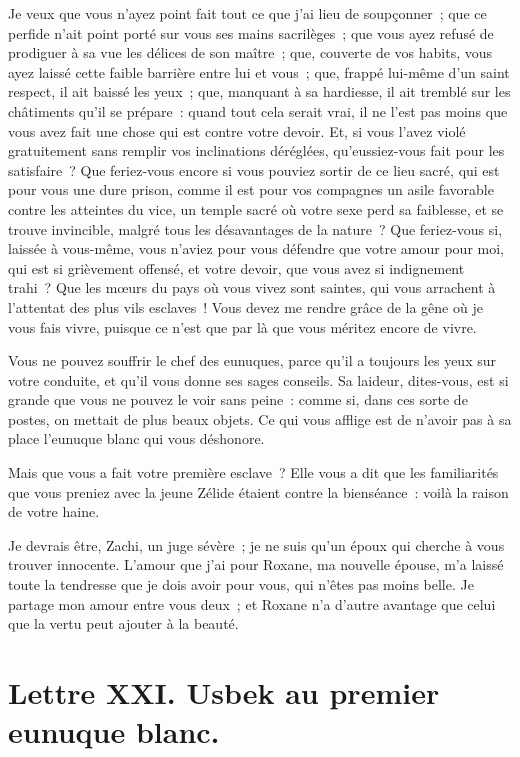 \documentclass[french,twoside]{book} %
\newcommand{\dateline}[1]{\medskip{\RaggedLeft{#1}\par}\bigskip}
\begin{document}
Je veux que vous n’ayez point fait tout ce que j’ai lieu de soupçonner ; que ce perfide n’ait point porté sur vous ses mains sacrilèges ; que vous ayez refusé de prodiguer à sa vue les délices de son maître ; que, couverte de vos habits, vous ayez laissé cette faible barrière entre lui et vous ; que, frappé lui-même d’un saint respect, il ait baissé les yeux ; que, manquant à sa hardiesse, il ait tremblé sur les châtiments qu’il se prépare : quand tout cela serait vrai, il ne l’est pas moins que vous avez fait une chose qui est contre votre devoir. Et, si vous l’avez violé gratuitement sans remplir vos inclinations déréglées, qu’eussiez-vous fait pour les satisfaire ? Que feriez-vous encore si vous pouviez sortir de ce lieu sacré, qui est pour vous une dure prison, comme il est pour vos compagnes un asile favorable contre les atteintes du vice, un temple sacré où votre sexe perd sa faiblesse, et se trouve invincible, malgré tous les désavantages de la nature ? Que feriez-vous si, laissée à vous-même, vous n’aviez pour vous défendre que votre amour pour moi, qui est si grièvement offensé, et votre devoir, que vous avez si indignement trahi ? Que les mœurs du pays où vous vivez sont saintes, qui vous arrachent à l’attentat des plus vils esclaves ! Vous devez me rendre grâce de la gêne où je vous fais vivre, puisque ce n’est que par là que vous méritez encore de vivre.\par
Vous ne pouvez souffrir le chef des eunuques, parce qu’il a toujours les yeux sur votre conduite, et qu’il vous donne ses sages conseils. Sa laideur, dites-vous, est si grande que vous ne pouvez le voir sans peine : comme si, dans ces sorte de postes, on mettait de plus beaux objets. Ce qui vous afflige est de n’avoir pas à sa place l’eunuque blanc qui vous déshonore.\par
Mais que vous a fait votre première esclave ? Elle vous a dit que les familiarités que vous preniez avec la jeune Zélide étaient contre la bienséance : voilà la raison de votre haine.\par
Je devrais être, Zachi, un juge sévère ; je ne suis qu’un époux qui cherche à vous trouver innocente. L’amour que j’ai pour Roxane, ma nouvelle épouse, m’a laissé toute la tendresse que je dois avoir pour vous, qui n’êtes pas moins belle. Je partage mon amour entre vous deux ; et Roxane n’a d’autre avantage que celui que la vertu peut ajouter à la beauté.\par

\dateline{À Smyrne, le 12 de la lune de Zilcadé, 1711.}
\section[{Lettre XXI. Usbek au premier eunuque blanc.}]{Lettre XXI. Usbek au premier eunuque blanc.}\renewcommand{\leftmark}{Lettre XXI. Usbek au premier eunuque blanc.}
\end{document}
